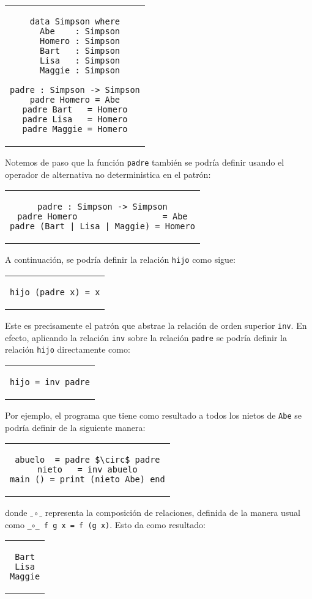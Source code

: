 \begin{center}
\begin{tabular}{c}
\begin{lstlisting}[mathescape=true]
data Simpson where
  Abe    : Simpson
  Homero : Simpson
  Bart   : Simpson
  Lisa   : Simpson
  Maggie : Simpson

padre : Simpson -> Simpson
padre Homero = Abe
padre Bart   = Homero
padre Lisa   = Homero
padre Maggie = Homero
\end{lstlisting}
\end{tabular}
\end{center}
Notemos de paso que la función \verb|padre| también se podría definir
usando el operador de alternativa no deterministica en el patrón:
\begin{center}
\begin{tabular}{c}
\begin{lstlisting}[mathescape=true]
padre : Simpson -> Simpson
padre Homero                 = Abe
padre (Bart | Lisa | Maggie) = Homero
\end{lstlisting}
\end{tabular}
\end{center}
A continuación, se podría definir la relación \verb|hijo| como sigue:
\begin{center}
\begin{tabular}{c}
\begin{lstlisting}[mathescape=true]
hijo (padre x) = x
\end{lstlisting}
\end{tabular}
\end{center}
Este es precisamente el patrón que abstrae la relación de orden superior \verb|inv|.
En efecto, aplicando la relación \verb|inv| sobre la relación \verb|padre|
se podría definir la relación \verb|hijo| directamente como:
\begin{center}
\begin{tabular}{c}
\begin{lstlisting}[mathescape=true]
hijo = inv padre
\end{lstlisting}
\end{tabular}
\end{center}
Por ejemplo, el programa que tiene como resultado a todos los nietos
de \verb|Abe| se podría definir de la siguiente manera:
\begin{center}
\begin{tabular}{c}
\begin{lstlisting}[mathescape=true]
abuelo  = padre $\circ$ padre
nieto   = inv abuelo
main () = print (nieto Abe) end
\end{lstlisting}
\end{tabular}
\end{center}
donde $\_\circ\_$ representa la composición de relaciones,
definida de la manera usual como \texttt{\_$\circ$\_ f g x = f (g x)}.
Esto da como resultado:
\begin{center}
\begin{tabular}{c}
\begin{lstlisting}[mathescape=true]
Bart
Lisa
Maggie
\end{lstlisting}
\end{tabular}
\end{center}
\bigskip


